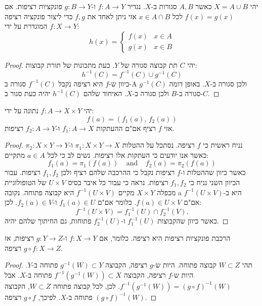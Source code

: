 \documentclass{tstextbook}
\begin{document}
\begin{proposition}
יהי \(X=A\cup B\) כאשר \(A,B\) סגורות ב-\(X\). נגדיר \(f:A\to Y\) ו-\(g:B\to Y\) פונקציות רציפות. אם \(f(x)=g(x)\) לכל \(x \in A \cap B\) אזי ניתן לאחד את \(f,g\) כדי ליצור פונקציה רציפה \(f:X\to Y\) המוגדרת על ידי:
$$h(x)=\begin{cases}f(x) & x \in A \\g(x) & x \in B
\end{cases}$$

\end{proposition}
\begin{proof}
יהי \(C\) תת קבוצה סגורה של \(Y\). כעת מתכונות של תורת קבוצות:
$$h^{-1}(C)=f^{-1}(C)\cup g^{-1}(C)$$
כיוון ש-\(f\) היא רציפה נקבל \(f^{-1}(C)\) סגורה ב-A ולכן סגורה ב-\(X\). באופן דומה \(g^{-1}(C)\) סגורה ב-\(B\) ולכן סגורה ב-\(X\). האיחוד שלהם \(h^{-1}(C)\) יהיה כעת סגור ב-\(C\).

\end{proof}
\begin{proposition}
יהי \(f:A\to X\times Y\) נתונה על ידי:
$$f(a)=(f_{1}(a),\,f_{2}(a))$$
אזי \(f\) רציף אם"ם ההעתקות \(f_{1}:A\to X\) ו-\(f_{2}:A\to Y\) רציפות.

\end{proposition}
\begin{proof}
נניח ראשית כי \(f\) רציפה. נסתכל על ההטלות \(\pi_{1}:X\times Y\to X\) ו-\(\pi_{2}:X\times Y\to Y\) כאשר אנו יודעים כי העתקות אלו רציפות. נשים לב כי לכל \(a \in A\) מתקיים:
$$f_{1}(a)=\pi_{1}(f(a))\ \ \ \ \ \mathrm{and}\ \ \ \ \ f_{2}(a)=\pi_{2}(f(a))$$
כאשר כיוון שההטלות ו-\(f\) רציפות נקבל כי ההרכבה שלהם רציף ולכן \(f_{1},f_{2}\) רציפות.
עבור הכיוון השני נניח כי \(f_{1},f_{2}\) רציפות. נראה כי עבור כל איבר בסיס \(U\times V\) של הטופולוגיית מכפלה \(X \times Y\) מקיים \(f^{-1}(U\times V)\) היא קבוצה פתוחה. נקובה a היא ב-\(f^{-1}(U\times V)\) אם"ם \(f(a)\in U \times V\). כלומר אם"ם \(f_{1}(a) \in U\) ו-\(f_{2}(a)\in V\). לכן:
$$f^{-1}(U\times V)=f_{1}^{-1}(U)\cap f_{2}^{-1}(V).$$
כאשר כיוון שהקבוצות \(f_{1}^{-1}(U)\) ו-\(f_{2}^{-1}(U)\) פתוחות, גם החיתוך שלהם יהיה.

\end{proof}
\begin{proposition}
הרכבת פונקציות רציפות היא רציפה. כלומר, אם \(f: X \to Y\) ו-\(g: Y \to Z\) רציפות, אז \(g \circ f: X \to Z\) רציפה.

\end{proposition}
\begin{proof}
תהי \(W \subset Z\) קבוצה פתוחה. היות ש-\(g\) רציפה, הקבוצה \(g^{-1}(W) \subset Y\) פתוחה ב-\(Y\). היות ש-\(f\) רציפה, הקבוצה \(f^{-1}(g^{-1}(W)) \subset X\) פתוחה ב-\(X\). אבל \(f^{-1}(g^{-1}(W)) = (g \circ f)^{-1}(W)\). לכן, לכל קבוצה פתוחה \(W \subset Z\), הקבוצה \((g \circ f)^{-1}(W)\) פתוחה ב-\(X\). לפיכך, \(g \circ f\) רציפה.

\end{proof}
\end{document}
